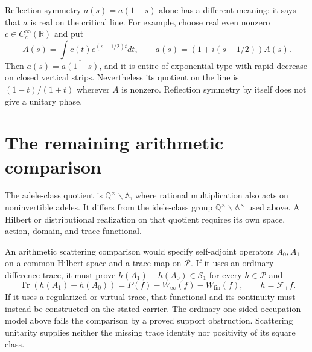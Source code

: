 Reflection symmetry $a(s)=\overline{a(1-\bar s)}$ alone has a
different meaning: it says that $a$ is real on the critical line.
For example, choose real even nonzero $c\in C_c^\infty(\mathbb R)$
and put
\[
 A(s)=\int c(t)e^{(s-1/2)t}dt,\qquad
 a(s)=(1+i(s-1/2))A(s).
\]
Then $a(s)=\overline{a(1-\bar s)}$, and it is entire of exponential
type with rapid decrease on closed vertical strips. Nevertheless
its quotient on the line is $(1-t)/(1+t)$ wherever $A$ is nonzero.
Reflection symmetry by itself does not give a unitary phase.

\section{The remaining arithmetic comparison}

\begin{definition}
\label{v4-arith:w7-j:def:connes-ac-space}
The adele-class quotient is $\mathbb Q^\times\backslash\mathbb A$,
where rational multiplication also acts on noninvertible adeles.
It differs from the idele-class group
$\mathbb Q^\times\backslash\mathbb A^\times$ used above.
A Hilbert or distributional realization on that quotient requires
its own space, action, domain, and trace functional.
\end{definition}

An arithmetic scattering comparison would specify self-adjoint
operators $A_0,A_1$ on a common Hilbert space and a trace map on
$\mathscr P$. If it uses an ordinary difference trace, it must prove
$h(A_1)-h(A_0)\in\mathcal S_1$ for every $h\in\mathscr P$ and
\[
 \operatorname{Tr}(h(A_1)-h(A_0))
 =P(f)-W_\infty(f)-W_{\mathrm{fin}}(f),\qquad h=\mathcal F_+f.
\]
If it uses a regularized or virtual trace, that functional and its
continuity must instead be constructed on the stated carrier.
The ordinary one-sided occupation model above fails the comparison
by a proved support obstruction. Scattering unitarity supplies
neither the missing trace identity nor positivity of its square class.
